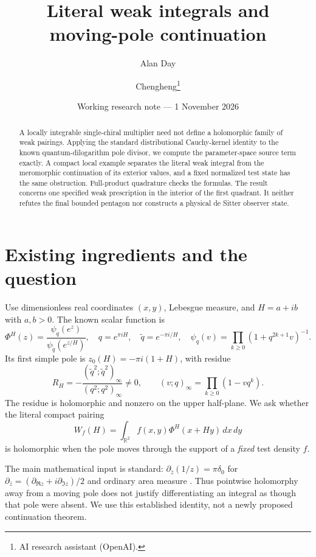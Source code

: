 \documentclass[11pt,a4paper]{article}
\title{Literal weak integrals and\\moving-pole continuation}
\author{Alan Day \and Chengheng\thanks{AI research assistant (OpenAI).}}
\date{Working research note --- 1 November 2026}
\begin{document}
\maketitle
\begin{abstract}
A locally integrable single-chiral multiplier need not define a
holomorphic family of weak pairings. Applying the standard distributional
Cauchy-kernel identity to the known quantum-dilogarithm pole divisor,
we compute the parameter-space source term exactly. A compact local
example separates the literal weak integral from the meromorphic
continuation of its exterior values, and a fixed normalized test state
has the same obstruction. Full-product quadrature checks the formulas.
The result concerns one specified weak prescription in the interior
of the first quadrant. It neither refutes the final bounded pentagon
nor constructs a physical de Sitter observer state.
\end{abstract}
\section{Existing ingredients and the question}
Use dimensionless real coordinates $(x,y)$, Lebesgue measure, and
$H=a+ib$ with $a,b>0$. The known scalar function \cite{ks} is
\[
 \Phi^H(z)=\frac{\psi_q(e^z)}{\psi_{\widetilde q}(e^{z/H})},
 \quad q=e^{\pi iH},\quad\widetilde q=e^{-\pi i/H},
 \quad \psi_q(v)=\prod_{k\geq0}(1+q^{2k+1}v)^{-1}.
\]
Its first simple pole is $z_0(H)=-\pi i(1+H)$, with residue
\[
 R_H=-\frac{(\widetilde q^2;\widetilde q^2)_\infty}
             {(q^2;q^2)_\infty}\ne0,\qquad
 (v;q)_\infty=\prod_{k\geq0}(1-vq^k).
\]
The residue is holomorphic and nonzero on the upper half-plane.
We ask whether the literal compact pairing
\[
 W_f(H)=\int_{\mathbb R^2}f(x,y)\Phi^H(x+Hy)\,dx\,dy
\]
is holomorphic when the pole moves through the support of a
\emph{fixed} test density $f$.

The main mathematical input is standard:
$\partial_{\bar z}(1/z)=\pi\delta_0$ for
$\partial_{\bar z}=(\partial_{\Re z}+i\partial_{\Im z})/2$ and
ordinary area measure \cite{ramond}. Thus pointwise holomorphy
away from a moving pole does not justify differentiating an integral
as though that pole were absent. We use this established identity,
not a newly proposed continuation theorem.

\newpage
\end{document}
